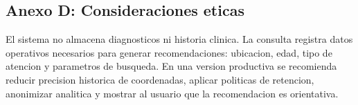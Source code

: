 \documentclass[12pt,a4paper]{article}
\begin{document}
\subsection{Anexo D: Consideraciones eticas}
El sistema no almacena diagnosticos ni historia clinica. La consulta registra datos operativos necesarios para generar recomendaciones: ubicacion, edad, tipo de atencion y parametros de busqueda. En una version productiva se recomienda reducir precision historica de coordenadas, aplicar politicas de retencion, anonimizar analitica y mostrar al usuario que la recomendacion es orientativa.
\end{document}
